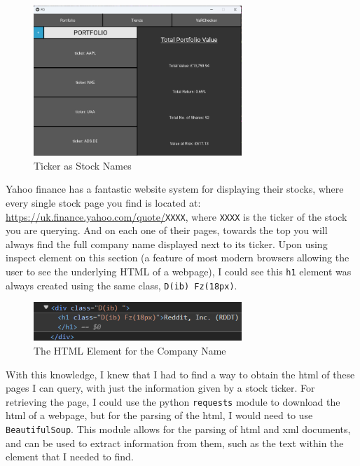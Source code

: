 \documentclass{article}
\begin{document}
\begin{figure}[h]
  \centering
  \includegraphics[width=0.7\textwidth]{Images/Term 2 Images/image (15).png}
  \caption{Ticker as Stock Names}
  \label{fig:Ticker Names}
\end{figure}

Yahoo finance has a fantastic website system for displaying their stocks, where every single stock page you find is located at: \url{https://uk.finance.yahoo.com/quote/}\texttt{XXXX}, where \texttt{XXXX} is the ticker of the stock you are querying. And on each one of their pages, towards the top you will always find the full company name displayed next to its ticker. Upon using inspect element on this section (a feature of most modern browsers allowing the user to see the underlying HTML of a webpage), I could see this \texttt{h1} element was always created using the same class, \texttt{D(ib) Fz(18px)}.\\\vspace{0.3cm}

\begin{figure}[h]
  \centering
  \includegraphics[width=0.7\textwidth]{Images/Term 2 Images/HTML Element.png}
  \caption{The HTML Element for the Company Name}
  \label{fig:HTML Element}
\end{figure}

\vspace{0.3cm}
With this knowledge, I knew that I had to find a way to obtain the html of these pages I can query, with just the information given by a stock ticker. For retrieving the page, I could use the python \texttt{requests} module to download the html of a webpage, but for the parsing of the html, I would need to use \texttt{BeautifulSoup}. This module allows for the parsing of html and xml documents, and can be used to extract information from them, such as the text within the element that I needed to find.
\end{document}
